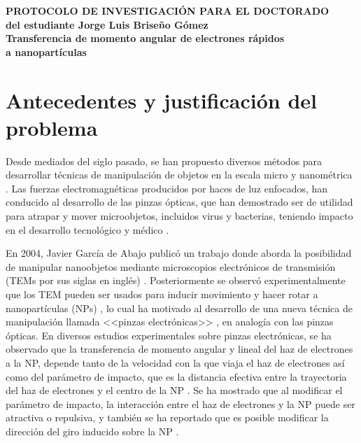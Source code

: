 \documentclass[letter,12pt]{article}
\numberwithin{equation}{section}
\begin{document}
\begin{center}
\textbf{PROTOCOLO DE INVESTIGACIÓN PARA EL DOCTORADO}\\
\textbf{del estudiante Jorge Luis Briseño Gómez}
\\
\vspace{0.8 cm}
\textbf{\Large  Transferencia de momento angular de electrones rápidos \\  a nanopartículas}
\end{center}

\section{Antecedentes y justificación del problema}

Desde mediados del siglo pasado, se han propuesto diversos métodos para desarrollar técnicas de manipulación de objetos en la escala micro y nanométrica \cite{ashkin1970acceleration, ashkin1987optical, Ashkin, custance2009atomic, dholakia2011shaping, marago2013optical, romo2020controlled}. Las fuerzas electromagnéticas producidos por haces de luz enfocados, han conducido al desarrollo de las pinzas ópticas, que han demostrado ser de utilidad para atrapar y mover microobjetos, incluidos virus y bacterias, teniendo impacto en el desarrollo tecnológico y médico \cite{ashkin1970acceleration, ashkin1987optical, Ashkin}.  

En 2004, Javier García de Abajo publicó un trabajo donde aborda la posibilidad de manipular nanoobjetos mediante microscopios electrónicos de transmisión (TEMs por sus siglas en inglés) \cite{GarciadeAbajo0}. Posteriormente se observó experimentalmente que los TEM pueden ser usados para inducir movimiento y hacer rotar a nanopartículas (NPs) \cite{Batson01, zheng2012electron}, lo cual ha motivado al desarrollo de una nueva técnica de manipulación llamada <<pinzas electrónicas>> \cite{Batson, oleshko2005electron, Oleshko}, en analogía con las pinzas ópticas. En diversos estudios experimentales sobre pinzas electrónicas, se ha observado que la transferencia de momento angular y lineal del haz de electrones a la NP, depende tanto de la velocidad con la que viaja el haz de electrones así como del parámetro de impacto, que es la distancia efectiva entre la trayectoria del haz de electrones y el centro de la NP \cite{OLESHKO2013203, Oleshko, Batson, Batson01, zheng2012electron, xu2010transmission}.  Se ha mostrado que al modificar el parámetro de impacto, la interacción entre el haz de electrones y la NP puede ser atractiva o repulsiva, y también se ha reportado que es posible modificar la dirección del giro inducido sobre la NP \cite{OLESHKO2013203, Batson, Oleshko}. 
\end{document}
